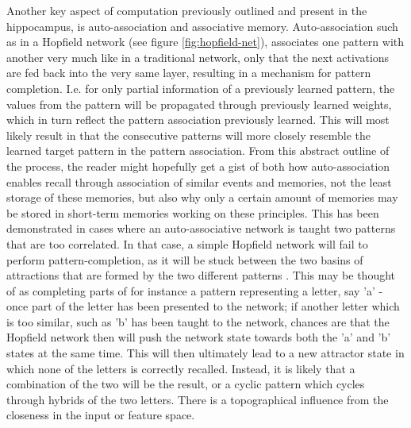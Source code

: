 Another key aspect of computation previously outlined and present in the hippocampus, is auto-association and associative memory. Auto-association such as in a Hopfield network (see figure \ref{fig:hopfield-net}), associates one pattern with another very much like in a traditional network, only that the next activations are fed back into the very same layer, resulting in a mechanism for pattern completion. I.e. for only partial information of a previously learned pattern, the values from the pattern will be propagated through previously learned weights, which in turn reflect the pattern association previously learned. This will most likely result in that the consecutive patterns will more closely resemble the learned target pattern in the pattern association. From this abstract outline of the process, the reader might hopefully get a gist of both how auto-association enables recall through association of similar events and memories, not the least storage of these memories, but also why only a certain amount of memories may be stored in short-term memories working on these principles. This has been demonstrated in cases where an auto-associative network is taught two patterns that are too correlated. In that case, a simple Hopfield network will fail to perform pattern-completion, as it will be stuck between the two basins of attractions that are formed by the two different patterns \citep{Rolls1998chpt3}. This may be thought of as completing parts of for instance a pattern representing a letter, say 'a' - once part of the letter has been presented to the network; if another letter which is too similar, such as 'b' has been taught to the network, chances are that the Hopfield network then will push the network state towards both the 'a' and 'b' states at the same time. This will then ultimately lead to a new attractor state in which none of the letters is correctly recalled. Instead, it is likely that a combination of the two will be the result, or a cyclic pattern which cycles through hybrids of the two letters. There is a topographical influence from the closeness in the input or feature space.
